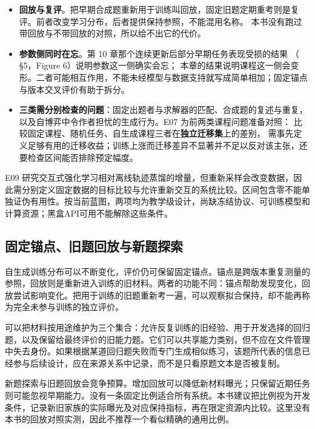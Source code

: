 \begin{itemize}
\sloppy
  \item \textbf{回放与复评}。把早期合成题重新用于训练叫回放，固定旧题定期重考则是复评。前者改变学习分布，后者提供保持参照，不能混用名称。
        本书没有跑过带回放与不带回放的对照，所以给不出它的代价。
  \item \textbf{参数侧同时在忘}。第 10 章那个连续更新后部分早期任务表现受损的结果
        （\cite{seal-2506} §5，Figure 6）说明参数这一侧确实会忘；
        本章的结果说明课程这一侧会变形。二者可能相互作用，不能未经模型与数据支持就写成简单相加；固定锚点与版本交叉评价有助于拆分。
  \item \textbf{三类需分别检查的问题}：固定出题者与求解器的匹配、合成题的复述与重复，
        以及自博弈中令作者担忧的生成行为。E07 为前两类课程问题准备对照：
        比较固定课程、随机任务、自生成课程三者在\textbf{独立迁移集}上的差别，
        需事先定义足够有用的迁移收益；训练上涨而迁移差异不显著并不足以反对该主张，还要检查区间能否排除预定幅度。
\end{itemize}

\begin{sloppypar}
E09 研究交互式强化学习相对离线轨迹蒸馏的增量，但重新采样会改变数据，因此需分别定义固定数据的目标比较与允许重新交互的系统比较。区间包含零不能单独证伪有用性。按当前蓝图，两项均为教学级设计，尚缺冻结协议、可训练模型和计算资源；黑盒API可用不能解除这些条件。
\end{sloppypar}

\subsection{固定锚点、旧题回放与新题探索}
\label{sec:ch11-replaydesign}

自生成训练分布可以不断变化，评价仍可保留固定锚点。锚点是跨版本重复测量的参照，回放则是重新进入训练的旧材料。两者的功能不同：锚点帮助发现变化，回放尝试影响变化。把用于训练的旧题重新考一遍，可以观察拟合保持，却不能再称为完全未参与训练的独立评价。

可以把材料按用途维护为三个集合：允许反复训练的旧经验、用于开发选择的回归题，以及保留给最终评价的旧能力题。它们可以共享能力类别，但不应在文件管理中失去身份。如果根据某道回归题失败而专门生成相似练习，该题所代表的信息已经参与后续设计，应在来源关系中记录，而不是只看原题文本是否被复制。

新题探索与旧题回放会竞争预算。增加回放可以降低新材料曝光；只保留近期任务则可能忽视早期能力。没有一条固定比例适合所有系统。本书建议把比例视为开发条件，记录新旧家族的实际曝光及对应保持指标，再在限定资源内比较。这里没有本书的回放对照实测，因此不推荐一个看似精确的通用比例。


